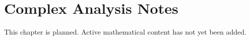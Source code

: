 
\section*{Complex Analysis Notes}
This chapter is planned. Active mathematical content has not yet been added.
